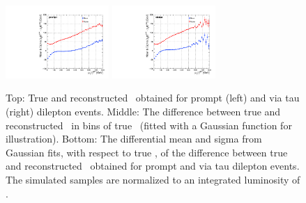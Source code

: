 \begin{figure}
\begin{center}
    \includegraphics[width=0.35\textwidth]{fig_fullRun2UL/KinRecoResolutions/top_pT_multiresidual_prompt.pdf}
    \includegraphics[width=0.35\textwidth]{fig_fullRun2UL/KinRecoResolutions/top_pT_multiresidual_viatau.pdf}\\
    \caption{\small Top: True and reconstructed \ptt\ obtained for prompt (left) and via tau (right) \ttbar dilepton events.
    Middle: The difference between true and reconstructed \ptt\ in bins of true \ptt\ (fitted with a Gaussian function for illustration).
    Bottom: The differential mean and sigma from Gaussian fits, with respect to true \ptt, of the difference between true and reconstructed \ptt\ obtained for prompt and via tau \ttbar dilepton events.
    The simulated samples are normalized to an integrated luminosity of \lumivalueRuniiUL.}
    \label{fig:kinrec:resolution-ptt}
 \end{center}
\end{figure}

